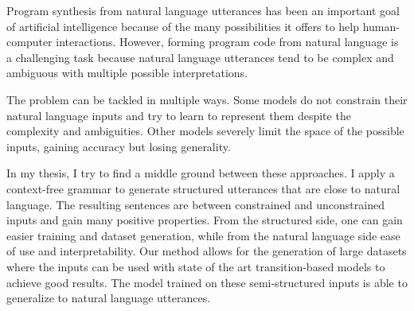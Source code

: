 Program synthesis from natural language utterances has been an important goal of
artificial intelligence because of the many possibilities it offers to help
human-computer interactions. However, forming program code from natural language
is a challenging task because natural language utterances tend to be complex and
ambiguous with multiple possible interpretations.
 
The problem can be tackled in multiple ways. Some models do not constrain their
natural language inputs and try to learn to represent them despite the
complexity and ambiguities. Other models severely limit the space of the
possible inputs, gaining accuracy but losing generality.
 
In my thesis, I try to find a middle ground between these approaches. I apply a
context-free grammar to generate structured utterances that are close to natural
language. The resulting sentences are between constrained and unconstrained
inputs and gain many positive properties. From the structured side, one can gain
easier training and dataset generation, while from the natural language side
ease of use and interpretability. Our method allows for the generation of large
datasets where the inputs can be used with state of the art transition-based
models to achieve good results. The model trained on these semi-structured
inputs is able to generalize to natural language utterances.